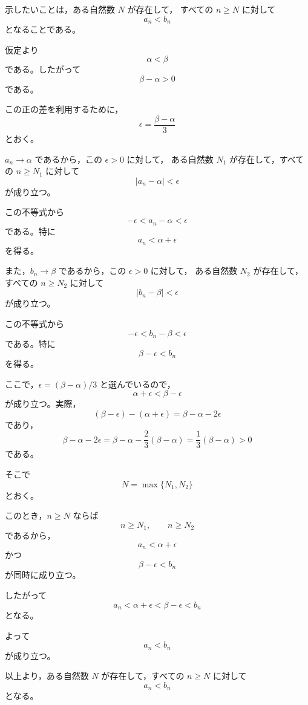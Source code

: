 \begin{strategy}
	示したいことは，ある自然数 $N$ が存在して，
	すべての $n\geq N$ に対して
	\[
		a_n<b_n
	\]
	となることである。

	仮定より
	\[
		\alpha<\beta
	\]
	である。したがって
	\[
		\beta-\alpha>0
	\]
	である。

	この正の差を利用するために，
	\[
		\epsilon=\frac{\beta-\alpha}{3}
	\]
	とおく。

	$a_n\to\alpha$ であるから，この $\epsilon>0$ に対して，
	ある自然数 $N_1$ が存在して，すべての $n\geq N_1$ に対して
	\[
		|a_n-\alpha|<\epsilon
	\]
	が成り立つ。

	この不等式から
	\[
		-\epsilon<a_n-\alpha<\epsilon
	\]
	である。特に
	\[
		a_n<\alpha+\epsilon
	\]
	を得る。

	また，$b_n\to\beta$ であるから，この $\epsilon>0$ に対して，
	ある自然数 $N_2$ が存在して，すべての $n\geq N_2$ に対して
	\[
		|b_n-\beta|<\epsilon
	\]
	が成り立つ。

	この不等式から
	\[
		-\epsilon<b_n-\beta<\epsilon
	\]
	である。特に
	\[
		\beta-\epsilon<b_n
	\]
	を得る。

	ここで，$\epsilon=(\beta-\alpha)/3$ と選んでいるので，
	\[
		\alpha+\epsilon<\beta-\epsilon
	\]
	が成り立つ。実際，
	\[
		(\beta-\epsilon)-(\alpha+\epsilon)
		=
		\beta-\alpha-2\epsilon
	\]
	であり，
	\[
		\beta-\alpha-2\epsilon
		=
		\beta-\alpha-\frac{2}{3}(\beta-\alpha)
		=
		\frac{1}{3}(\beta-\alpha)>0
	\]
	である。

	そこで
	\[
		N=\max\{N_1,N_2\}
	\]
	とおく。

	このとき，$n\geq N$ ならば
	\[
		n\geq N_1,
		\qquad
		n\geq N_2
	\]
	であるから，
	\[
		a_n<\alpha+\epsilon
	\]
	かつ
	\[
		\beta-\epsilon<b_n
	\]
	が同時に成り立つ。

	したがって
	\[
		a_n<\alpha+\epsilon<\beta-\epsilon<b_n
	\]
	となる。

	よって
	\[
		a_n<b_n
	\]
	が成り立つ。

	以上より，ある自然数 $N$ が存在して，すべての $n\geq N$ に対して
	\[
		a_n<b_n
	\]
	となる。
\end{strategy}